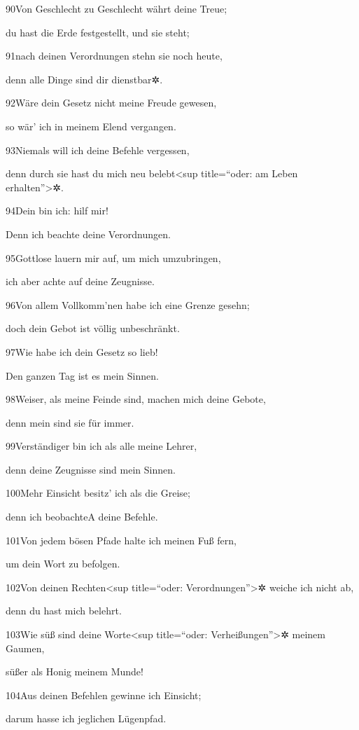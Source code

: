 90Von Geschlecht zu Geschlecht währt deine Treue;

du hast die Erde festgestellt, und sie steht;

91nach deinen Verordnungen stehn sie noch heute,

denn alle Dinge sind dir dienstbar✲.

92Wäre dein Gesetz nicht meine Freude gewesen,

so wär' ich in meinem Elend vergangen.

93Niemals will ich deine Befehle vergessen,

denn durch sie hast du mich neu belebt\textless sup title=``oder: am
Leben erhalten''\textgreater✲.

94Dein bin ich: hilf mir!

Denn ich beachte deine Verordnungen.

95Gottlose lauern mir auf, um mich umzubringen,

ich aber achte auf deine Zeugnisse.

96Von allem Vollkomm'nen habe ich eine Grenze gesehn;

doch dein Gebot ist völlig unbeschränkt.

97Wie habe ich dein Gesetz so lieb!

Den ganzen Tag ist es mein Sinnen.

98Weiser, als meine Feinde sind, machen mich deine Gebote,

denn mein sind sie für immer.

99Verständiger bin ich als alle meine Lehrer,

denn deine Zeugnisse sind mein Sinnen.

100Mehr Einsicht besitz' ich als die Greise;

denn ich beobachte{A} deine Befehle.

101Von jedem bösen Pfade halte ich meinen Fuß fern,

um dein Wort zu befolgen.

102Von deinen Rechten\textless sup title=``oder:
Verordnungen''\textgreater✲ weiche ich nicht ab,

denn du hast mich belehrt.

103Wie süß sind deine Worte\textless sup title=``oder:
Verheißungen''\textgreater✲ meinem Gaumen,

süßer als Honig meinem Munde!

104Aus deinen Befehlen gewinne ich Einsicht;

darum hasse ich jeglichen Lügenpfad.

